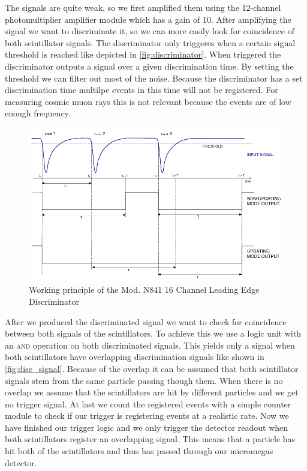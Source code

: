 \documentclass[sn-mathphys-num,iicol]{sn-jnl}
\theoremstyle{thmstyleone}
\theoremstyle{thmstyletwo}
\theoremstyle{thmstylethree}
\begin{document}
The signals are quite weak, so we first amplified them using the 12-channel photomultiplier amplifier module which has a gain of 10.
After amplifying the signal we want to discriminate it, so we can more easily look for coincidence of both scintillator signals.
The discriminator only triggeres when a certain signal threshold is reached like depicted in \autoref{fig:discriminator}. 
When triggered the discriminator outputs a signal over a given discrimination time.
By setting the threshold we can filter out most of the noise.
Because the discriminator has a set discrimination time multilpe events in this time will not be registered. 
For measuring cosmic muon rays this is not relevant because the events are of low enough frequency.

\begin{figure}
  \includegraphics[width=\linewidth]{figures/discriminator.png}
  \caption{Working principle of the Mod. N841 16 Channel Leading Edge Discriminator}
  \label{fig:discriminator}
\end{figure}

After we produced the discriminated signal we want to check for coincidence between both signals of the scintillators.
To achieve this we use a logic unit with an \textsc{and} operation on both discriminated signals.
This yields only a signal when both scintillators have overlapping discrimination signals like shown in \autoref{fig:disc_signal}.
Because of the overlap it can be assumed that both scintillator signals stem from the same particle passing though them.
When there is no overlap we assume that the scintillators are hit by different particles and we get no trigger signal.
At last we count the registered events with a simple counter module to check if our trigger is registering events at a realistic rate.
Now we have finished our trigger logic and we only trigger the detector readout when both scintillators register an overlapping signal.
This means that a particle has hit both of the scintillators and thus has passed through our micromegas detector.
\end{document}
